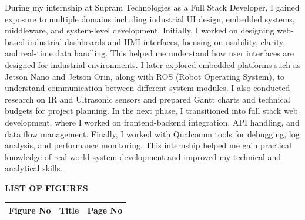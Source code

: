 \documentclass[12pt,a4paper]{report}
\newif\ifshowborder
\begin{document}
During my internship at Supram Technologies as a Full Stack Developer, I gained exposure to multiple domains including industrial UI design, embedded systems, middleware, and system-level development. Initially, I worked on designing web-based industrial dashboards and HMI interfaces, focusing on usability, clarity, and real-time data handling. This helped me understand how user interfaces are designed for industrial environments. I later explored embedded platforms such as Jetson Nano and Jetson Orin, along with ROS (Robot Operating System), to understand communication between different system modules. I also conducted research on IR and Ultrasonic sensors and prepared Gantt charts and technical budgets for project planning. In the next phase, I transitioned into full stack web development, where I worked on frontend-backend integration, API handling, and data flow management. Finally, I worked with Qualcomm tools for debugging, log analysis, and performance monitoring. This internship helped me gain practical knowledge of real-world system development and improved my technical and analytical skills.


\newpage
\tableofcontents

\newpage
\begin{center}
{\LARGE \textbf{LIST OF FIGURES}\par}
\end{center}

\vspace{0.3cm}
\begin{tabular}{@{} p{2cm} p{10cm} r @{}}
\textbf{Figure No} & \textbf{Title} & \textbf{Page No} \\
\midrule
\end{tabular}

\newpage
\showborderfalse       %
\end{document}
